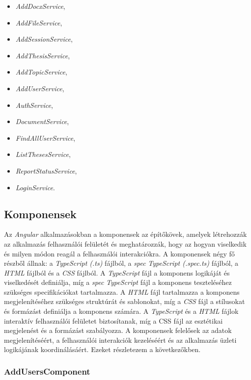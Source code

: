 \begin{itemize}

\item{\textit{AddDocxService}},
\item{\textit{AddFileService}},
\item{\textit{AddSessionService}},
\item{\textit{AddThesisService}},
\item{\textit{AddTopicService}},
\item{\textit{AddUserService}},
\item{\textit{AuthService}},
\item{\textit{DocumentService}},
\item{\textit{FindAllUserService}},
\item{\textit{ListThesesService}},
\item{\textit{ReportStatusService}},
\item{\textit{LoginService}}.

\end{itemize}

\subsection{Komponensek}

Az \textit{Angular} alkalmazásokban a komponensek az építőkövek, amelyek létrehozzák az alkalmazás felhasználói felületét és meghatározzák, hogy az hogyan viselkedik és milyen módon reagál a felhasználói interakciókra. A komponensek négy fő részből állnak: a \textit{TypeScript (.ts)} fájlból, a \textit{spec} \textit{TypeScript (.spec.ts)} fájlból, a \textit{HTML} fájlból és a \textit{CSS} fájlból. A \textit{TypeScript} fájl a komponens logikáját és viselkedését definiálja, míg a \textit{spec} \textit{TypeScript} fájl a komponens teszteléséhez szükséges specifikációkat tartalmazza. A \textit{HTML} fájl tartalmazza a komponens megjelenítéséhez szükséges struktúrát és sablonokat, míg a \textit{CSS} fájl a stílusokat és formázást definiálja a komponens számára. A \textit{TypeScript} és a \textit{HTML} fájlok interaktív felhasználói felületet biztosítanak, míg a CSS fájl az esztétikai megjelenést és a formázást szabályozza. A komponensek felelősek az adatok megjelenítéséért, a felhasználói interakciók kezeléséért és az alkalmazás üzleti logikájának koordinálásáért. Ezeket részletezem a következőkben.

\subsubsection{AddUsersComponent}

